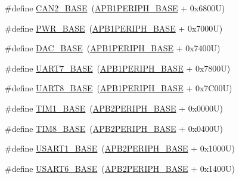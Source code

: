 \begin{DoxyCompactItemize}
\item 
\#define \hyperlink{group___peripheral__memory__map_gaf7b8267b0d439f8f3e82f86be4b9fba1}{C\+A\+N2\+\_\+\+B\+A\+SE}~(\hyperlink{group___peripheral__memory__map_ga45666d911f39addd4c8c0a0ac3388cfb}{A\+P\+B1\+P\+E\+R\+I\+P\+H\+\_\+\+B\+A\+SE} + 0x6800\+U)
\item 
\#define \hyperlink{group___peripheral__memory__map_gac691ec23dace8b7a649a25acb110217a}{P\+W\+R\+\_\+\+B\+A\+SE}~(\hyperlink{group___peripheral__memory__map_ga45666d911f39addd4c8c0a0ac3388cfb}{A\+P\+B1\+P\+E\+R\+I\+P\+H\+\_\+\+B\+A\+SE} + 0x7000\+U)
\item 
\#define \hyperlink{group___peripheral__memory__map_gad18d0b914c7f68cecbee1a2d23a67d38}{D\+A\+C\+\_\+\+B\+A\+SE}~(\hyperlink{group___peripheral__memory__map_ga45666d911f39addd4c8c0a0ac3388cfb}{A\+P\+B1\+P\+E\+R\+I\+P\+H\+\_\+\+B\+A\+SE} + 0x7400\+U)
\item 
\#define \hyperlink{group___peripheral__memory__map_ga3150e4b10ec876c0b20f22de12a8fa40}{U\+A\+R\+T7\+\_\+\+B\+A\+SE}~(\hyperlink{group___peripheral__memory__map_ga45666d911f39addd4c8c0a0ac3388cfb}{A\+P\+B1\+P\+E\+R\+I\+P\+H\+\_\+\+B\+A\+SE} + 0x7800\+U)
\item 
\#define \hyperlink{group___peripheral__memory__map_gac9c6cd59a248941d9d2462ab21a2346e}{U\+A\+R\+T8\+\_\+\+B\+A\+SE}~(\hyperlink{group___peripheral__memory__map_ga45666d911f39addd4c8c0a0ac3388cfb}{A\+P\+B1\+P\+E\+R\+I\+P\+H\+\_\+\+B\+A\+SE} + 0x7\+C00\+U)
\item 
\#define \hyperlink{group___peripheral__memory__map_gaf8aa324ca5011b8173ab16585ed7324a}{T\+I\+M1\+\_\+\+B\+A\+SE}~(\hyperlink{group___peripheral__memory__map_ga25b99d6065f1c8f751e78f43ade652cb}{A\+P\+B2\+P\+E\+R\+I\+P\+H\+\_\+\+B\+A\+SE} + 0x0000\+U)
\item 
\#define \hyperlink{group___peripheral__memory__map_ga5b72f698b7a048a6f9fcfe2efe5bc1db}{T\+I\+M8\+\_\+\+B\+A\+SE}~(\hyperlink{group___peripheral__memory__map_ga25b99d6065f1c8f751e78f43ade652cb}{A\+P\+B2\+P\+E\+R\+I\+P\+H\+\_\+\+B\+A\+SE} + 0x0400\+U)
\item 
\#define \hyperlink{group___peripheral__memory__map_ga86162ab3f740db9026c1320d46938b4d}{U\+S\+A\+R\+T1\+\_\+\+B\+A\+SE}~(\hyperlink{group___peripheral__memory__map_ga25b99d6065f1c8f751e78f43ade652cb}{A\+P\+B2\+P\+E\+R\+I\+P\+H\+\_\+\+B\+A\+SE} + 0x1000\+U)
\item 
\#define \hyperlink{group___peripheral__memory__map_gade4d3907fd0387ee832f426f52d568bb}{U\+S\+A\+R\+T6\+\_\+\+B\+A\+SE}~(\hyperlink{group___peripheral__memory__map_ga25b99d6065f1c8f751e78f43ade652cb}{A\+P\+B2\+P\+E\+R\+I\+P\+H\+\_\+\+B\+A\+SE} + 0x1400\+U)

\end{DoxyCompactItemize}
